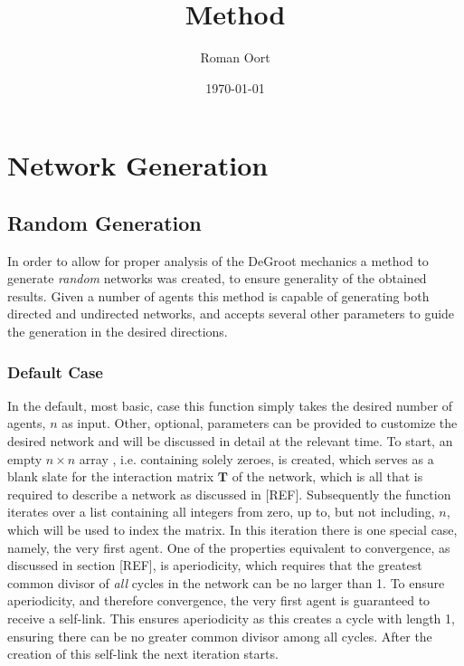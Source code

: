 \documentclass{article}
\title{Method}
\author{Roman Oort}
\date{\today}
\newcommand{\T}{\textbf{T}}
\begin{document}
\maketitle

\tableofcontents
\newpage

\section{Network Generation}

\subsection{Random Generation}
\label{generation:random}
In order to allow for proper analysis of the DeGroot mechanics a method to generate \emph{random} networks was created, to ensure generality of the obtained results. Given a number of agents this method is capable of generating both directed and undirected networks, and accepts several other parameters to guide the generation in the desired directions.

\subsubsection{Default Case}
In the default, most basic, case this function simply takes the desired number of agents, $n$ as input. Other, optional, parameters can be provided to customize the desired network and will be discussed in detail at the relevant time.
To start, an empty $n\times n$ array \cite{2020NumPy-Array}, i.e. containing solely zeroes, is created, which serves as a blank slate for the interaction matrix $\T$ of the network, which is all that is required to describe a network as discussed in [REF].
Subsequently the function iterates over a list containing all integers from zero, up to, but not including, $n$, which will be used to index the matrix. \newline
In this iteration there is one special case, namely, the very first agent. One of the properties equivalent to convergence, as discussed in section [REF], is aperiodicity, which requires that the greatest common divisor of \emph{all} cycles in the network can be no larger than 1. To ensure aperiodicity, and therefore convergence, the very first agent is guaranteed to receive a self-link. This ensures aperiodicity as this creates a cycle with length 1, ensuring there can be no greater common divisor among all cycles. After the creation of this self-link the next iteration starts. \newline
\end{document}
